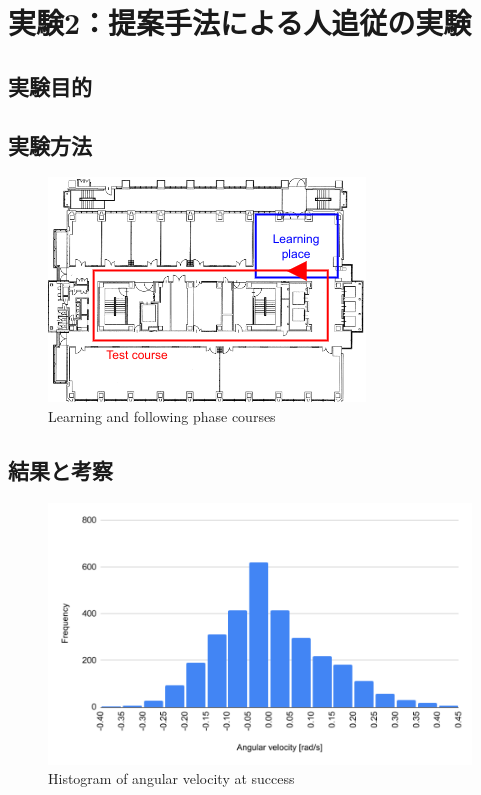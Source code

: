 \section{実験2：提案手法による人追従の実験}

\subsection{実験目的}
\subsection{実験方法}

  \begin{figure}[h]
    \centering
    \includegraphics[keepaspectratio, scale=0.80] {images/RobotGuidance_course.png}
    \captionsetup{justification=raggedright} %
    \caption{Learning and following phase courses}
    \label{Fig:RobotGuidance_course}
  \end{figure}

\subsection{結果と考察}

  \begin{figure}[h]
    \centering
    \includegraphics[keepaspectratio, scale=0.60] {images/RobotGuidance_success_histogram.png}
    \captionsetup{justification=raggedright} %
    \caption{Histogram of angular velocity at success}
    \label{Fig:RobotGuidance_success_histogram}
  \end{figure}

